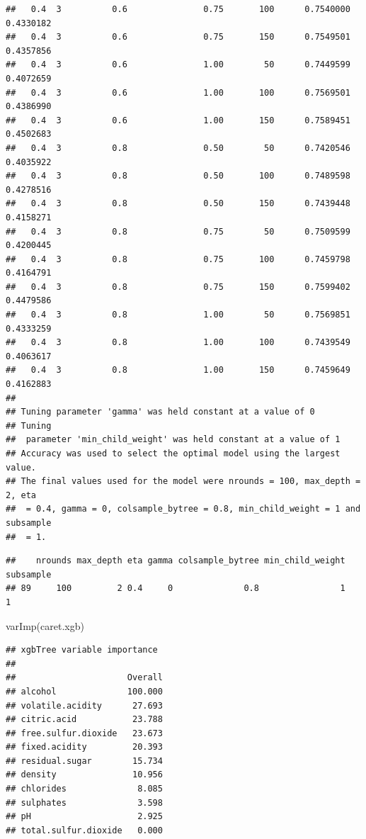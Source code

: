 \documentclass[
]{book}
\newenvironment{Shaded}{\begin{snugshade}}{\end{snugshade}}
\newcommand{\FunctionTok}[1]{\textcolor[rgb]{0.00,0.00,0.00}{#1}}
\newcommand{\NormalTok}[1]{#1}
\newcommand{\SpecialCharTok}[1]{\textcolor[rgb]{0.00,0.00,0.00}{#1}}
\theoremstyle{break}
\theoremstyle{definition}
\theoremstyle{definition}
\theoremstyle{definition}
\theoremstyle{definition}
\theoremstyle{remark}
\begin{document}
\begin{verbatim}
##   0.4  3          0.6               0.75       100      0.7540000  0.4330182
##   0.4  3          0.6               0.75       150      0.7549501  0.4357856
##   0.4  3          0.6               1.00        50      0.7449599  0.4072659
##   0.4  3          0.6               1.00       100      0.7569501  0.4386990
##   0.4  3          0.6               1.00       150      0.7589451  0.4502683
##   0.4  3          0.8               0.50        50      0.7420546  0.4035922
##   0.4  3          0.8               0.50       100      0.7489598  0.4278516
##   0.4  3          0.8               0.50       150      0.7439448  0.4158271
##   0.4  3          0.8               0.75        50      0.7509599  0.4200445
##   0.4  3          0.8               0.75       100      0.7459798  0.4164791
##   0.4  3          0.8               0.75       150      0.7599402  0.4479586
##   0.4  3          0.8               1.00        50      0.7569851  0.4333259
##   0.4  3          0.8               1.00       100      0.7439549  0.4063617
##   0.4  3          0.8               1.00       150      0.7459649  0.4162883
## 
## Tuning parameter 'gamma' was held constant at a value of 0
## Tuning
##  parameter 'min_child_weight' was held constant at a value of 1
## Accuracy was used to select the optimal model using the largest value.
## The final values used for the model were nrounds = 100, max_depth = 2, eta
##  = 0.4, gamma = 0, colsample_bytree = 0.8, min_child_weight = 1 and subsample
##  = 1.
\end{verbatim}

\begin{Shaded}
\end{Shaded}

\begin{verbatim}
##    nrounds max_depth eta gamma colsample_bytree min_child_weight subsample
## 89     100         2 0.4     0              0.8                1         1
\end{verbatim}

\begin{Shaded}
\begin{Highlighting}[]
\FunctionTok{varImp}\NormalTok{(caret.xgb)}
\end{Highlighting}
\end{Shaded}

\begin{verbatim}
## xgbTree variable importance
## 
##                      Overall
## alcohol              100.000
## volatile.acidity      27.693
## citric.acid           23.788
## free.sulfur.dioxide   23.673
## fixed.acidity         20.393
## residual.sugar        15.734
## density               10.956
## chlorides              8.085
## sulphates              3.598
## pH                     2.925
## total.sulfur.dioxide   0.000
\end{verbatim}
\end{document}
